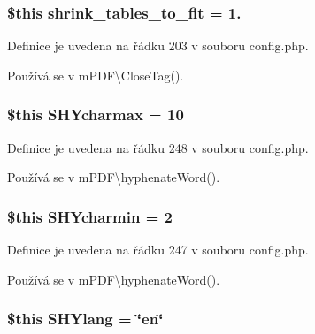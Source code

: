 \hypertarget{config_8php_a74d8a58f2cd94f0d19d9b4a1a8f946cf}{
\subsubsection[{shrink\-\_\-tables\-\_\-to\-\_\-fit}]{\setlength{\rightskip}{0pt plus 5cm}\$this shrink\-\_\-tables\-\_\-to\-\_\-fit = 1.}}\label{config_8php_a74d8a58f2cd94f0d19d9b4a1a8f946cf}


Definice je uvedena na řádku 203 v souboru config.\-php.



Používá se v m\-P\-D\-F\textbackslash{}\-Close\-Tag().

\hypertarget{config_8php_a876c55bc73fb60df32bb171cae3ee487}{
\subsubsection[{S\-H\-Ycharmax}]{\setlength{\rightskip}{0pt plus 5cm}\$this S\-H\-Ycharmax = 10}}\label{config_8php_a876c55bc73fb60df32bb171cae3ee487}


Definice je uvedena na řádku 248 v souboru config.\-php.



Používá se v m\-P\-D\-F\textbackslash{}hyphenate\-Word().

\hypertarget{config_8php_a43edd6f70c2c8cd13c33184f79a190e2}{
\subsubsection[{S\-H\-Ycharmin}]{\setlength{\rightskip}{0pt plus 5cm}\$this S\-H\-Ycharmin = 2}}\label{config_8php_a43edd6f70c2c8cd13c33184f79a190e2}


Definice je uvedena na řádku 247 v souboru config.\-php.



Používá se v m\-P\-D\-F\textbackslash{}hyphenate\-Word().

\hypertarget{config_8php_a9ac72428ad1d3fa35e199e8ba0b84146}{
\subsubsection[{S\-H\-Ylang}]{\setlength{\rightskip}{0pt plus 5cm}\$this S\-H\-Ylang = \char`\"{}en\char`\"{}}}\label{config_8php_a9ac72428ad1d3fa35e199e8ba0b84146}


